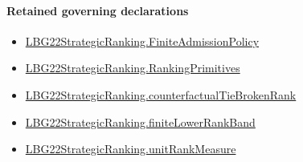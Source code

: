 \documentclass[10pt]{article}
\begin{document}
\paragraph{Retained governing declarations}
\begin{itemize}\raggedright
\item \hyperlink{paper-prerequisite-d056dd7c8060653c}{LBG22\allowbreak{}Strategic\allowbreak{}Ranking.\allowbreak{}Finite\allowbreak{}Admission\allowbreak{}Policy}
\item \hyperlink{paper-prerequisite-9bbcc12f4a1736bf}{LBG22\allowbreak{}Strategic\allowbreak{}Ranking.\allowbreak{}Ranking\allowbreak{}Primitives}
\item \hyperlink{paper-prerequisite-6ed45e46d01eadeb}{LBG22\allowbreak{}Strategic\allowbreak{}Ranking.\allowbreak{}counterfactual\allowbreak{}Tie\allowbreak{}Broken\allowbreak{}Rank}
\item \hyperlink{paper-prerequisite-a42f440ddc254fa7}{LBG22\allowbreak{}Strategic\allowbreak{}Ranking.\allowbreak{}finite\allowbreak{}Lower\allowbreak{}Rank\allowbreak{}Band}
\item \hyperlink{governing-declaration-678cf48d549cb620}{LBG22\allowbreak{}Strategic\allowbreak{}Ranking.\allowbreak{}unit\allowbreak{}Rank\allowbreak{}Measure}
\end{itemize}
\end{document}
